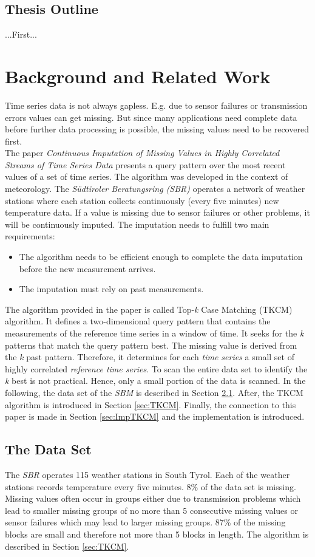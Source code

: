 \documentclass[abstracton,12pt]{scrreprt}
\begin{document}
\section{Thesis Outline}
...First...

\chapter{Background and Related Work}
Time series data is not always gapless. E.g. due to sensor failures or transmission errors values can get missing. But since many applications need complete data before further data processing is possible, the missing values need to be recovered first. \\The paper \emph{Continuous Imputation of Missing Values in Highly Correlated Streams of Time Series Data} \cite{BScT} presents a query pattern over the most recent values of a set of time series. The algorithm was developed in the context of meteorology. The \emph{Südtiroler Beratungsring (SBR)} operates a network of weather stations where each station collects continuously (every five minutes) new temperature data. If a value is missing due to sensor failures or other problems, it will be continuously imputed. The imputation needs to fulfill two main requirements: 
\begin{itemize}  
	\item The algorithm needs to be efficient enough to complete the data imputation before the new measurement arrives. 
	\item The imputation must rely on past measurements.
\end{itemize}
The algorithm provided in the paper is called Top-\emph{k} Case Matching (TKCM) algorithm. It defines a two-dimensional query pattern that contains the measurements of the reference time series in a window of time. It seeks for the \emph{k} patterns that match the query pattern best. The missing value is derived from the \emph{k} past pattern. Therefore, it determines for each \emph{time series} a small set of highly correlated \emph{reference time series}. To scan the entire data set to identify the \emph{k} best is not practical. Hence, only a small portion of the data is scanned. In the following, the data set of the \emph{SBM} is described in Section \ref{sec:DS}. After, the TKCM algorithm is introduced in Section \ref{sec:TKCM}. Finally, the connection to this paper is made in Section \ref{sec:ImpTKCM} and the implementation is introduced. 


\section{The Data Set}
\label{sec:DS}
The \emph{SBR} operates 115 weather stations in South Tyrol. Each of the weather stations records temperature every five minutes. 8\% of the data set is missing. Missing values often occur in groups either due to transmission problems which lead to smaller missing groups of no more than 5 consecutive missing values or sensor failures which may lead to larger missing groups. 87\% of the missing blocks are small and therefore not more than 5 blocks in length. The algorithm is described in Section \ref{sec:TKCM}. 
\end{document}

